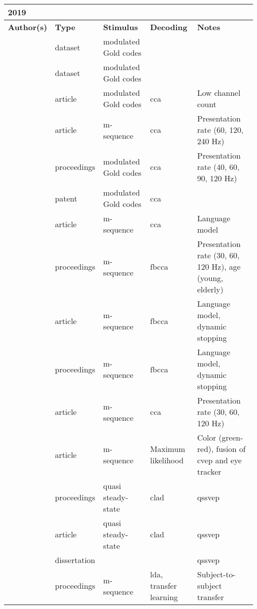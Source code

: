 \documentclass[a4paper,landscape]{article}
\begin{document}
\begin{table}[H]
	\begin{tabular}{p{5cm}p{2cm}p{5cm}p{5cm}p{6.5cm}}
		\textbf{2019} & & & & \\
		\toprule
		\textbf{Author(s)} & \textbf{Type} & \textbf{Stimulus} & \textbf{Decoding} & \textbf{Notes} \\
		\midrule
		\citeauthor{ahmadi2019dataset1} & dataset & modulated Gold codes & & \\
		\citeauthor{ahmadi2019dataset2} & dataset & modulated Gold codes & & \\
		\citeauthor{ahmadi2019} & article & modulated Gold codes & \acrshort{cca} & Low channel count \\
		\citeauthor{basaklar2019} & article & m-sequence & \acrshort{cca} & Presentation rate (60, 120, 240 Hz) \\
		\citeauthor{borhanazad2019} & proceedings & modulated Gold codes & \acrshort{cca} & Presentation rate (40, 60, 90, 120 Hz) \\
		\citeauthor{desain2019} & patent & modulated Gold codes & \acrshort{cca} & \\
		\citeauthor{gembler2019a} & article & m-sequence & \acrshort{cca} & Language model \\
		\citeauthor{gembler2019b} & proceedings & m-sequence & \acrshort{fbcca} & Presentation rate (30, 60, 120 Hz), age (young, elderly) \\
		\citeauthor{gembler2019c} & article & m-sequence & \acrshort{fbcca} & Language model, dynamic stopping \\
		\citeauthor{gembler2019d} & proceedings & m-sequence & \acrshort{fbcca} & Language model, dynamic stopping \\
		\citeauthor{grigoryan2019} & article & m-sequence & \acrshort{cca} & Presentation rate (30, 60, 120 Hz) \\
		\citeauthor{kadiouglu2019} & article & m-sequence & Maximum likelihood & Color (green-red), fusion of \acrshort{cvep} and eye tracker \\
		\citeauthor{kaya2019a} & proceedings & quasi steady-state & \acrshort{clad} & \acrshort{qssvep} \\
		\citeauthor{kaya2019b} & article & quasi steady-state & \acrshort{clad} & \acrshort{qssvep} \\
		\citeauthor{kaya2019c} & dissertation & & & \acrshort{qssvep} \\
		\citeauthor{luo2019} & proceedings & m-sequence & \acrshort{lda}, transfer learning & Subject-to-subject transfer \\

\end{tabular}
\end{table}
\end{document}
